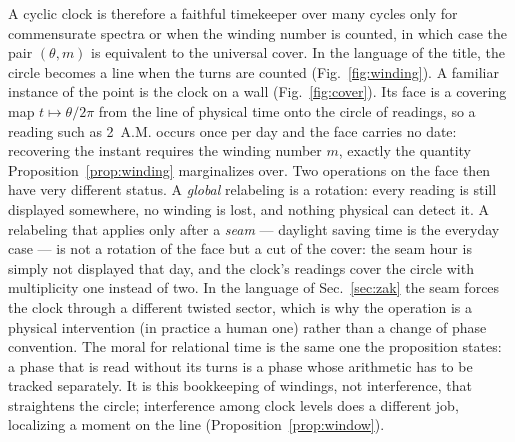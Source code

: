 \documentclass[aps,prd,onecolumn,notitlepage,10pt,amsmath,amssymb,amsfonts,nofootinbib]{revtex4-2}
\theoremstyle{definition}
\theoremstyle{remark}
\begin{document}
A cyclic clock is therefore a faithful timekeeper over many cycles only for commensurate spectra or when the winding number is counted, in which case the pair $(\theta,m)$ is equivalent to the universal cover. In the language of the title, the circle becomes a line when the turns are counted (Fig.~\ref{fig:winding}). A familiar instance of the point is the clock on a wall (Fig.~\ref{fig:cover}). Its face is a covering map $t\mapsto\theta/2\pi$ from the line of physical time onto the circle of readings, so a reading such as 2~A.M. occurs once per day and the face carries no date: recovering the instant requires the winding number $m$, exactly the quantity Proposition~\ref{prop:winding} marginalizes over. Two operations on the face then have very different status. A \emph{global} relabeling is a rotation: every reading is still displayed somewhere, no winding is lost, and nothing physical can detect it. A relabeling that applies only after a \emph{seam} --- daylight saving time is the everyday case --- is not a rotation of the face but a cut of the cover: the seam hour is simply not displayed that day, and the clock's readings cover the circle with multiplicity one instead of two. In the language of Sec.~\ref{sec:zak} the seam forces the clock through a different twisted sector, which is why the operation is a physical intervention (in practice a human one) rather than a change of phase convention. The moral for relational time is the same one the proposition states: a phase that is read without its turns is a phase whose arithmetic has to be tracked separately. It is this bookkeeping of windings, not interference, that straightens the circle; interference among clock levels does a different job, localizing a moment on the line (Proposition~\ref{prop:window}).
\end{document}
